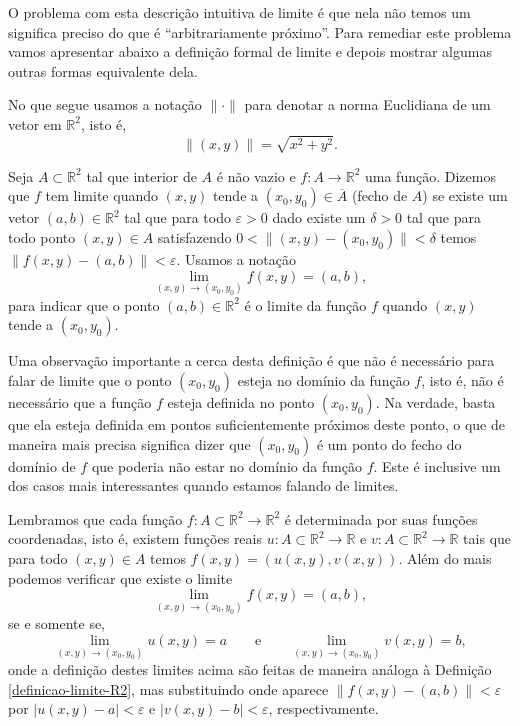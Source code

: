O problema com esta descrição intuitiva de limite  
é que nela não temos um significa preciso do que é ``arbitrariamente próximo''. 
Para remediar este problema vamos apresentar abaixo a definição formal de limite e 
depois mostrar algumas outras formas equivalente dela.

No que segue usamos a notação $\|\cdot\|$ para denotar a norma Euclidiana de um vetor
em $\mathbb{R}^2$, isto é, 
\[
\|(x,y)\| = \sqrt{x^2+y^2}.
\]



\begin{definicao}\label{definicao-limite-R2}
Seja $A\subset\mathbb{R}^2$ tal que interior de $A$ é não vazio e $f:A\to\mathbb{R}^2$ uma função.
Dizemos que $f$ tem limite quando $(x,y)$ tende a $(x_0,y_0)\in \overline{A}$ (fecho de $A$) 
se existe um vetor $(a,b)\in\mathbb{R}^2$ tal que para todo $\varepsilon>0$ dado existe um $\delta>0$
tal que para todo ponto $(x,y)\in A$ satisfazendo $0<\|(x,y)-(x_0,y_0)\|<\delta$ 
temos $\|f(x,y)-(a,b)\|<\varepsilon$. 
Usamos a notação 
\[
\lim_{(x,y)\to (x_0,y_0)} f(x,y) = (a,b),
\]
para indicar que o ponto $(a,b)\in\mathbb{R}^2$ é o limite da função $f$ 
quando $(x,y)$ tende a $(x_0,y_0)$. 
\end{definicao}

Uma observação importante a cerca desta definição é que não é necessário para falar de limite 
que o ponto $(x_0,y_0)$ esteja no domínio da função $f$, isto é, não é necessário que a função $f$
esteja definida no ponto $(x_0,y_0)$. Na verdade, basta que ela esteja definida em pontos suficientemente próximos
deste ponto, o que de maneira mais precisa significa dizer que $(x_0,y_0)$ é um ponto do fecho do domínio de $f$
que poderia não estar no domínio da função $f$. Este é inclusive um dos casos mais interessantes quando estamos 
falando de limites. 


Lembramos que cada função $f:A\subset\mathbb{R}^2\to\mathbb{R}^2$ é determinada por suas funções coordenadas, 
isto é, existem funções reais $u:A\subset\mathbb{R}^2\to\mathbb{R}$ e 
$v:A\subset\mathbb{R}^2\to\mathbb{R}$ tais que
para todo $(x,y)\in A$ temos $f(x,y)=(u(x,y),v(x,y))$.
Além do mais podemos verificar que existe o limite 
\[
\lim_{(x,y)\to (x_0,y_0)} f(x,y) = (a,b),
\]
se e somente se,
\[
\lim_{(x,y)\to (x_0,y_0)} u(x,y) = a
\qquad \text{e} \qquad 
\lim_{(x,y)\to (x_0,y_0)} v(x,y) = b,
\]
onde a definição destes limites acima são feitas de maneira análoga à 
Definição \ref{definicao-limite-R2}, mas substituindo onde aparece $\|f(x,y)-(a,b)\|<\varepsilon$
por $|u(x,y)-a|<\varepsilon$ e $|v(x,y)-b|<\varepsilon$, respectivamente. 


